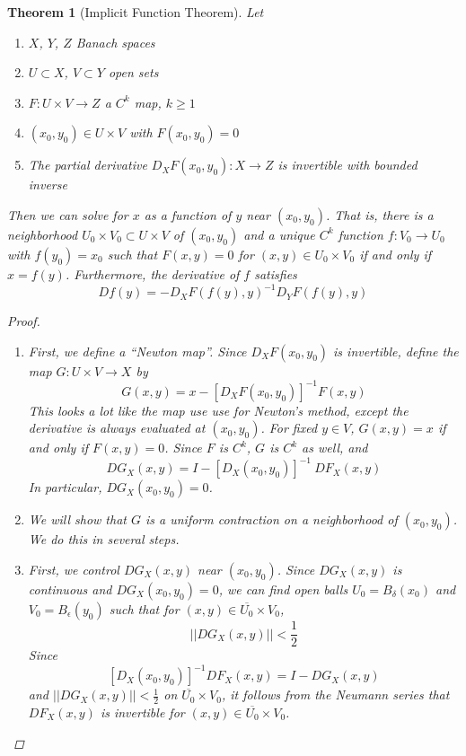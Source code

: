 \documentclass[10pt]{article}         %
\newtheorem{theorem}{Theorem}[section]
\theoremstyle{remark}
\begin{document}
\begin{theorem}[Implicit Function Theorem]
Let
\begin{enumerate}
\item $X$, $Y$, $Z$ Banach spaces
\item $U \subset X$, $V \subset Y$ open sets
\item $F: U \times V \rightarrow Z$ a $C^k$ map, $k \geq 1$
\item $(x_0, y_0) \in U \times V$ with $F(x_0, y_0) = 0$
\item The partial derivative $D_X F(x_0, y_0): X \rightarrow Z$ is invertible with bounded inverse
\end{enumerate}
Then we can solve for $x$ as a function of $y$ near $(x_0, y_0)$. That is, there is a neighborhood $U_0 \times V_0 \subset U \times V$ of $(x_0, y_0)$ and a unique $C^k$ function $f: V_0 \rightarrow U_0$ with $f(y_0) = x_0$ such that $F(x, y) = 0$ for $(x, y) \in U_0 \times V_0$ if and only if $x = f(y)$. Furthermore, the derivative of $f$ satisfies
\[
Df(y) = -D_X F(f(y),y)^{-1} D_Y F(f(y),y)
\]

\begin{proof}
\begin{enumerate}
\item First, we define a ``Newton map''. Since $D_X F(x_0, y_0)$ is invertible, define the map $G: U \times V \rightarrow X$ by 
\begin{equation}\label{defG}
G(x, y) = x - [D_X F(x_0, y_0)]^{-1} F(x, y)
\end{equation}
This looks a lot like the map use use for Newton's method, except the derivative is always evaluated at $(x_0, y_0)$. For fixed $y \in V$, $G(x, y) = x$ if and only if $F(x, y) = 0$. Since $F$ is $C^k$, $G$ is $C^k$ as well, and
\[
DG_X(x, y) = I - [D_X(x_0, y_0)]^{-1} \: DF_X(x, y)
\]
In particular, $DG_X(x_0, y_0) = 0$.

\item We will show that $G$ is a uniform contraction on a neighborhood of $(x_0, y_0)$. We do this in several steps.

\item First, we control $DG_X(x, y)$ near $(x_0, y_0)$. Since $DG_X(x, y)$ is continuous and $DG_X(x_0, y_0) = 0$, we can find open balls $U_0 = B_\delta(x_0)$ and $V_0 = B_\epsilon(y_0)$ such that for $(x, y) \in \overline{U_0} \times V_0$,
\[
||DG_X(x, y)|| < \frac{1}{2} 
\]
Since 
\[
[D_X(x_0, y_0)]^{-1} DF_X(x, y) = I - DG_X(x, y)
\]
and $||DG_X(x, y)|| < \frac{1}{2}$ on $\overline{U_0} \times V_0$, it follows from the Neumann series that $DF_X(x, y)$ is invertible for $(x, y) \in \overline{U_0} \times V_0$.


\end{enumerate}
\end{proof}
\end{theorem}
\end{document}
